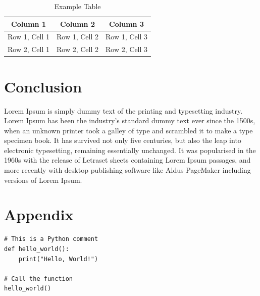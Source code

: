 \documentclass[12pt]{article}
\begin{document}
    \begin{table}[!htb]
        \centering
        \begin{tabular}{|c|c|c|}
            \hline
            \textbf{Column 1} & \textbf{Column 2} & \textbf{Column 3} \\
            \hline
            Row 1, Cell 1 & Row 1, Cell 2 & Row 1, Cell 3 \\
            Row 2, Cell 1 & Row 2, Cell 2 & Row 2, Cell 3 \\
            \hline
        \end{tabular}
        \caption{Example Table}
        \label{tab:example}
    \end{table}

    \newpage
    \section{Conclusion}
    Lorem Ipsum is simply dummy text of the printing and typesetting industry. Lorem Ipsum has been the industry's standard dummy text ever since the 1500s, when an unknown printer took a galley of type and scrambled it to make a type specimen book. It has survived not only five centuries, but also the leap into electronic typesetting, remaining essentially unchanged. It was popularised in the 1960s with the release of Letraset sheets containing Lorem Ipsum passages, and more recently with desktop publishing software like Aldus PageMaker including versions of Lorem Ipsum.

    \newpage
    \renewcommand{\refname}{Bibliography}
    
    

    \newpage
    \appendix
    \section{Appendix}
    \begin{lstlisting}
# This is a Python comment
def hello_world():
    print("Hello, World!")

# Call the function
hello_world()
    \end{lstlisting}
\end{document}
